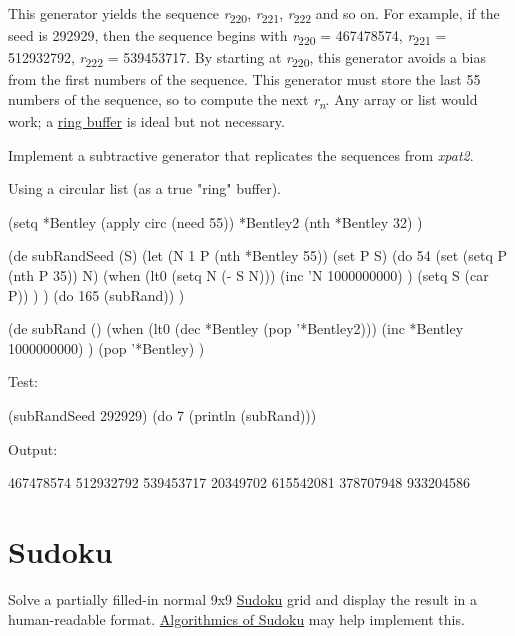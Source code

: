 This generator yields the sequence \emph{r}\textsubscript{220},
\emph{r}\textsubscript{221}, \emph{r}\textsubscript{222} and so on. For
example, if the seed is 292929, then the sequence begins with
\emph{r}\textsubscript{220} = 467478574, \emph{r}\textsubscript{221} =
512932792, \emph{r}\textsubscript{222} = 539453717. By starting at
\emph{r}\textsubscript{220}, this generator avoids a bias from the first
numbers of the sequence. This generator must store the last 55 numbers
of the sequence, so to compute the next
\emph{r}\textsubscript{\emph{n}}. Any array or list would work; a
\href{/mw/index.php?title=Ring\_buffer\&action=edit\&redlink=1}{ring
buffer} is ideal but not necessary.

Implement a subtractive generator that replicates the sequences from
\emph{xpat2}.



\begin{wideverbatim}

Using a circular list (as a true "ring" buffer).

(setq
   *Bentley (apply circ (need 55))
   *Bentley2 (nth *Bentley 32) )

(de subRandSeed (S)
   (let (N 1  P (nth *Bentley 55))
      (set P S)
      (do 54
         (set (setq P (nth P 35)) N)
         (when (lt0 (setq N (- S N)))
            (inc 'N 1000000000) )
         (setq S (car P)) ) )
   (do 165 (subRand)) )

(de subRand ()
   (when (lt0 (dec *Bentley (pop '*Bentley2)))
      (inc *Bentley 1000000000) )
   (pop '*Bentley) )

Test:

(subRandSeed 292929)
(do 7 (println (subRand)))

Output:

467478574
512932792
539453717
20349702
615542081
378707948
933204586

\end{wideverbatim}

\pagebreak{}
\section*{Sudoku}

Solve a partially filled-in normal 9x9
\href{http://en.wikipedia.org/wiki/Sudoku}{Sudoku} grid and display the
result in a human-readable format.
\href{http://en.wikipedia.org/wiki/Algorithmics\_of\_sudoku}{Algorithmics
of Sudoku} may help implement this.

